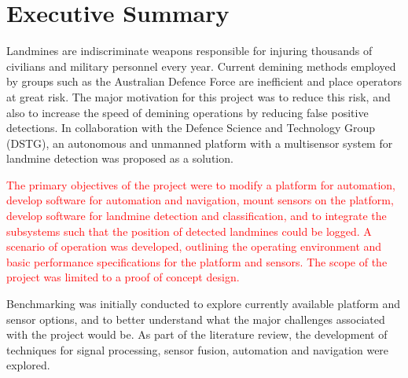 \documentclass[main.tex]{subfiles}
\begin{document}

{}	%
\chapter*{Executive Summary}
  

Landmines are indiscriminate weapons responsible for injuring thousands of civilians and military personnel every year. Current demining methods employed by groups such as the Australian Defence Force are inefficient and place operators at great risk. The major motivation for this project was to reduce this risk, and also to increase the speed of demining operations by reducing false positive detections. In collaboration with the Defence Science and Technology Group (DSTG), an autonomous and unmanned platform with a multisensor system for landmine detection was proposed as a solution. 

\textcolor{red}{The primary objectives of the project were to modify a platform for automation, develop software for automation and navigation, mount sensors on the platform, develop software for landmine detection and classification, and to integrate the subsystems such that the position of detected landmines could be logged. A scenario of operation was developed, outlining the operating environment and basic performance specifications for the platform and sensors. The scope of the project was limited to a proof of concept design.}

Benchmarking was initially conducted to explore currently available platform and sensor options, and to better understand what the major challenges associated with the project would be. As part of the literature review, the development of techniques for signal processing, sensor fusion, automation and navigation were explored.        
\end{document}
